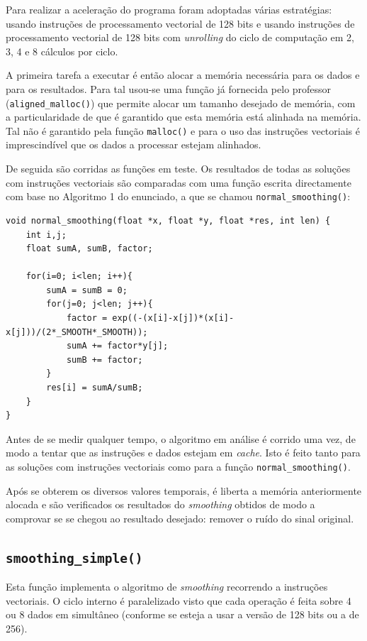 \documentclass[a4paper]{article}
\begin{document}
	Para realizar a aceleração do programa foram adoptadas várias estratégias: usando instruções de processamento vectorial de 128 bits e usando instruções de processamento vectorial de 128 bits com \textit{unrolling} do ciclo de computação em 2, 3, 4 e 8 cálculos por ciclo.
	
	A primeira tarefa a executar é então alocar a memória necessária para os dados e para os resultados. Para tal usou-se uma função já fornecida pelo professor (\texttt{aligned\_malloc()}) que permite alocar um tamanho desejado de memória, com a particularidade de que é garantido que esta memória está alinhada na memória. Tal não é garantido pela função \texttt{malloc()} e para o uso das instruções vectoriais é imprescindível que os dados a processar estejam alinhados.
	
	De seguida são corridas as funções em teste. Os resultados de todas as soluções com instruções vectoriais são comparadas com uma função escrita directamente com base no Algoritmo 1 do enunciado, a que se chamou \texttt{normal\_smoothing()}:
	
	\begin{verbatim}
void normal_smoothing(float *x, float *y, float *res, int len) {
    int i,j;
    float sumA, sumB, factor;
    
    for(i=0; i<len; i++){
        sumA = sumB = 0;
        for(j=0; j<len; j++){
            factor = exp((-(x[i]-x[j])*(x[i]-x[j]))/(2*_SMOOTH*_SMOOTH));
            sumA += factor*y[j];
            sumB += factor;
        }
        res[i] = sumA/sumB;
    }
}
	\end{verbatim}
	
	
	Antes de se medir qualquer tempo, o algoritmo em análise é corrido uma vez, de modo a tentar que as instruções e dados estejam em \textit{cache}. Isto é feito tanto para as soluções com instruções vectoriais como para a função \texttt{normal\_smoothing()}.
		
	Após se obterem os diversos valores temporais, é liberta a memória anteriormente alocada e são verificados os resultados do \textit{smoothing} obtidos de modo a comprovar se se chegou ao resultado desejado: remover o ruído do sinal original.
	
	\subsection{\texttt{smoothing\_simple()}}
	
	Esta função implementa o algoritmo de \textit{smoothing} recorrendo a instruções vectoriais. O ciclo interno é paralelizado visto que cada operação é feita sobre 4 ou 8 dados em simultâneo (conforme se esteja a usar a versão de 128 bits ou a de 256).
	
\end{document}
